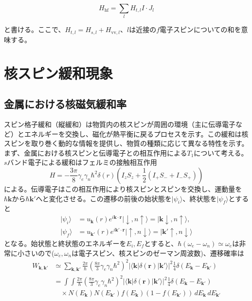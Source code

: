 \documentclass[11pt,a4j]{jreport}
\begin{document}
\begin{equation}
H_{\text{hf}} = \sum_{l} H_{t, l} I \cdot J_l
\end{equation}

と書ける。ここで、$H_{t, l} = H_{s, l} + H_{\text{vv}, l}$、$l$は近接の$f$電子スピンについての和を意味する。

\section{核スピン緩和現象}
\subsection{金属における核磁気緩和率}
スピン格子緩和（縦緩和）は物質内の核スピンが周囲の環境（主に伝導電子など）とエネルギーを交換し、磁化が熱平衡に戻るプロセスを示す。この緩和は核スピンを取り巻く動的な情報を提供し、物質の種類に応じて異なる特性を示す。まず、金属における核スピンと伝導電子との相互作用による$T_1$について考える。$s$バンド電子による緩和はフェルミの接触相互作用
\begin{equation}
  H = -\frac{3\pi}{8} \gamma_e \gamma_n \hbar^2 \delta(r) \left( I_z S_z + \frac{1}{2} \left( I_+ S_- + I_- S_+ \right) \right)
\end{equation}
による。伝導電子はこの相互作用により核スピンとスピンを交換し、運動量を$\hbar\bm k$から$\hbar \bm k'$へと変化させる。この遷移の前後の始状態を$|\psi_i \rangle $、終状態を$|\psi_f\rangle$とすると
\begin{align}
  |\psi_i\rangle &= u_{\bm k}(r)e^{i\bm{k} \cdot \bm{r}} | \downarrow, n \uparrow \rangle = | \bm{k} \downarrow, n \uparrow \rangle, \\
  |\psi_f\rangle &= u_{\bm k'}(r)e^{i\bm{k'} \cdot \bm{r}} | \uparrow, n \downarrow \rangle = | \bm{k'} \uparrow, n \downarrow \rangle
\end{align}
となる。始状態と終状態のエネルギーを$E_i,E_f$とすると、$\hbar(\omega_e-\omega_n)\simeq\omega_e$は非常に小さいので($\omega_e,\omega_n$は電子スピン、核スピンのゼーマン周波数)、遷移確率は
\begin{align}
  W_{\bm k,\bm k'} &\simeq \sum_{\bm{k},\bm{k'}} \frac{2\pi}{\hbar} \left( \frac{8\pi}{3} \gamma_e \gamma_n \hbar^2 \right)^2 \left| \langle \bm k |\delta(\bm r)|\bm k' \rangle \right|^2  \frac{1}{4} \delta(E_{\bm{k}} - E_{\bm{k'}})\\
  &= \int \int \frac{2\pi}{\hbar} \left( \frac{8\pi}{3} \gamma_e \gamma_n \hbar^2 \right)^2 \left| \langle \bm k |\delta(\bm r)| \bm k' \rangle \right|^2 \frac{1}{4} \delta(E_{\bm k} - E_{\bm k'}) \nonumber \\
  &\quad \times N(E_{\bm k}) N(E_{\bm k'}) f(E_{\bm k})(1 - f(E_{\bm k'})) \, dE_{\bm k} \, dE_{\bm k'}
\end{align}
\end{document}
